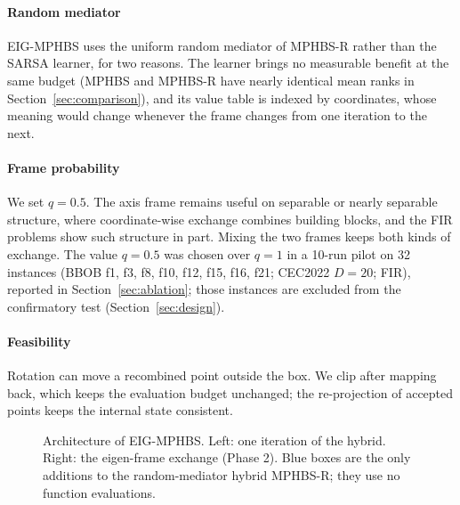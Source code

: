 \documentclass[preprint,12pt,authoryear]{elsarticle}
\theoremstyle{remark}
\begin{document}
\paragraph{Random mediator} EIG-MPHBS uses the uniform random mediator of MPHBS-R rather than the SARSA learner, for
two reasons. The learner brings no measurable benefit at the same budget (MPHBS and MPHBS-R have nearly identical
mean ranks in Section~\ref{sec:comparison}), and its value table is indexed by coordinates, whose meaning would change
whenever the frame changes from one iteration to the next.

\paragraph{Frame probability} We set $q=0.5$. The axis frame remains useful on separable or nearly separable structure,
where coordinate-wise exchange combines building blocks, and the FIR problems show such structure in part. Mixing the
two frames keeps both kinds of exchange. The value $q=0.5$ was chosen over $q=1$ in a 10-run pilot on 32 instances
(BBOB f1, f3, f8, f10, f12, f15, f16, f21; CEC2022 $D=20$; FIR), reported in Section~\ref{sec:ablation}; those
instances are excluded from the confirmatory test (Section~\ref{sec:design}).

\paragraph{Feasibility} Rotation can move a recombined point outside the box. We clip after mapping back, which keeps
the evaluation budget unchanged; the re-projection of accepted points keeps the internal state consistent.

\begin{figure}[!htbp]
\centering

\caption{Architecture of EIG-MPHBS. Left: one iteration of the hybrid. Right: the eigen-frame exchange (Phase 2).
Blue boxes are the only additions to the random-mediator hybrid MPHBS-R; they use no function evaluations.}
\label{fig:architecture}
\end{figure}
\end{document}
